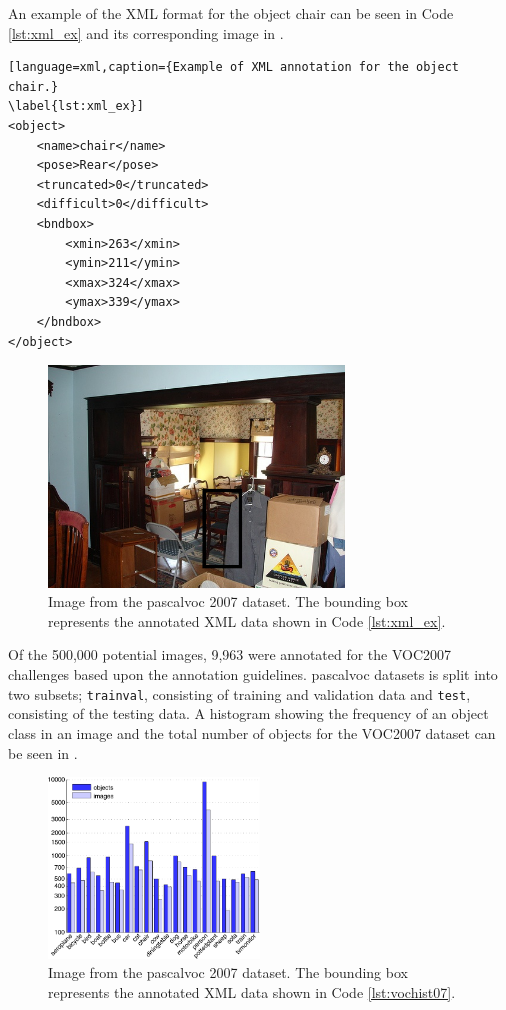 An example of the XML format for the object chair can be seen in Code \ref{lst:xml_ex} and its corresponding image in . 

\begin{lstlisting}[language=xml,caption={Example of XML annotation for the object chair.}
\label{lst:xml_ex}]
<object>
    <name>chair</name>
    <pose>Rear</pose>
    <truncated>0</truncated>
	<difficult>0</difficult>
	<bndbox>
		<xmin>263</xmin>
		<ymin>211</ymin>
		<xmax>324</xmax>
		<ymax>339</ymax>
	</bndbox>
</object>
\end{lstlisting}

\begin{figure}[H]
  \centering
    \includegraphics[width=0.7\textwidth]{Figs/Techanal/000005.jpg}
    \caption{Image from the \gls{pascalvoc} 2007 dataset. The bounding box represents the annotated XML data shown in Code \ref{lst:xml_ex}.}
    \label{fig:xml_eximg}
\end{figure}

Of the 500,000 potential images, 9,963 were annotated for the VOC2007 challenges based upon the annotation guidelines. \gls{pascalvoc} datasets is split into two subsets; \lstinline{trainval}, consisting of training and validation data and \lstinline{test}, consisting of the testing data. A histogram showing the frequency of an object class in an image and the total number of objects for the VOC2007 dataset can be seen in .

\begin{figure}[H]
  \centering
    \includegraphics[width=0.5\textwidth]{Figs/Techanal/vochist07.png}
    \caption{Image from the \gls{pascalvoc} 2007 dataset. The bounding box represents the annotated XML data shown in Code \ref{lst:vochist07}.}
    \label{fig:vochist07}
\end{figure}